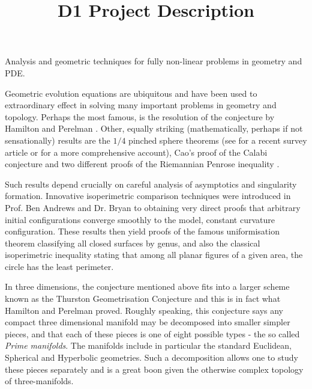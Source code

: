 \documentclass[12pt]{amsart}
\date{}
\title{D1 Project Description}
\renewcommand\maketitle{}
\begin{document}
\maketitle


\smallskip{}
\label{sec-1}
Analysis and geometric techniques for fully non-linear problems in geometry and PDE.

\smallskip{}
\label{sec-2}
Geometric evolution equations are ubiquitous and have been used to extraordinary effect in solving many important problems in geometry and topology.  Perhaps the most famous, is the resolution of the \poincare{} conjecture by Hamilton and Perelman \cite{MR2334563}.  Other, equally striking (mathematically, perhaps if not sensationally) results are the $1/4$ pinched sphere theorems (see \cite{MR2738904} for a recent survey article or \cite{MR2760593} for a more comprehensive account), Cao's proof of the Calabi conjecture \cite{MR799272} and two different proofs of the Riemannian Penrose inequality \cite{MR1916951, MR1908823}.

Such results depend crucially on careful analysis of asymptotics and singularity formation. Innovative isoperimetric comparison techniques were introduced in \cite{MR2729306,MR2794630,MR2843240,pbthesis,Bryan} Prof. Ben Andrews and Dr. Bryan to obtaining very direct proofs that arbitrary initial configurations converge smoothly to the model, constant curvature configuration. These results then yield proofs of the famous uniformisation theorem classifying all closed surfaces by genus, and also the classical isoperimetric inequality stating that among all planar figures of a given area, the circle has the least perimeter.

In three dimensions, the \poincare{} conjecture mentioned above fits into a larger scheme known as the Thurston Geometrisation Conjecture \cite{MR2334563} and this is in fact what Hamilton and Perelman proved. Roughly speaking, this conjecture says any compact three dimensional manifold may be decomposed into smaller simpler pieces, and that each of these pieces is one of eight possible types - the so called \emph{Prime manifolds}. The manifolds include in particular the standard Euclidean, Spherical and Hyperbolic geometries. Such a decomposition allows one to study these pieces separately and is a great boon given the otherwise complex topology of three-manifolds.
\end{document}
